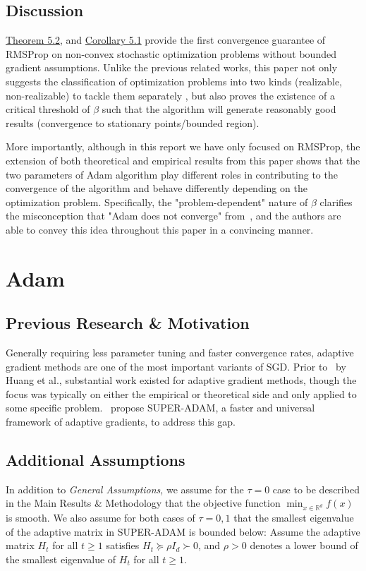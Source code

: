 \documentclass{article}
\begin{document}
\subsection{Discussion}
\hyperref[theom51]{Theorem 5.2}, and \hyperref[coro51]{Corollary 5.1} provide the first convergence guarantee of RMSProp on non-convex stochastic optimization problems without bounded gradient assumptions. Unlike the previous related works, this paper not only suggests the classification of optimization problems into two kinds (realizable, non-realizable) to tackle them separately , but also proves the existence of a critical threshold of $\beta$ such that the algorithm will generate reasonably good results (convergence to stationary points/bounded region).

More importantly, although in this report we have only focused on RMSProp, the extension of both theoretical and empirical results from this paper shows that the two parameters of Adam algorithm play different roles in contributing to the convergence of the algorithm and behave differently depending on the optimization problem. Specifically, the "problem-dependent" nature of $\beta$ clarifies the misconception that "Adam does not converge" from~\cite{https://doi.org/10.48550/arxiv.1904.09237}, and the authors are able to convey this idea throughout this paper in a convincing manner.
\section{Adam}
\label{section7}
\subsection{Previous Research \& Motivation}
Generally requiring less parameter tuning and faster convergence rates, adaptive gradient methods are one of the most important variants of SGD. Prior to~\cite{https://doi.org/10.48550/arxiv.2106.08208} by Huang et al., substantial work existed for adaptive gradient methods, though the focus was typically
on either the empirical or theoretical side and only applied to some specific problem.~\cite{https://doi.org/10.48550/arxiv.2106.08208} propose SUPER-ADAM, a faster and universal framework of adaptive gradients, to address this gap.
\subsection{Additional Assumptions}
In addition to \textit{General Assumptions}, we assume for the $\tau = 0$ case to be described in the Main Results \& Methodology that the objective function $\min_{x \in \mathbb{R}^d} f(x)$ is smooth. We also assume for both cases of $\tau=0,1$ that the smallest eigenvalue of the adaptive matrix
in SUPER-ADAM is bounded below: Assume the adaptive matrix $H_t$ for all $t\geq 1$ satisfies $H_t \succeq \rho I_d\succ 0$, and $\rho > 0$ denotes a lower bound of the smallest eigenvalue of $H_t$ for all $t\geq 1$.
\end{document}
